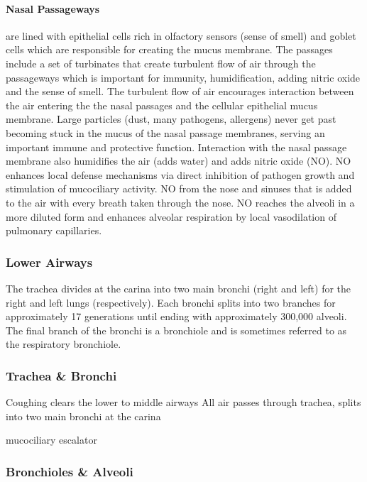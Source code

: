 \paragraph{Nasal Passageways} are lined with epithelial cells rich in olfactory sensors (sense of smell) and goblet cells which are responsible for creating the mucus membrane. The passages include a set of turbinates that create turbulent flow of air through the passageways which is important for immunity, humidification, adding nitric oxide and the sense of smell. The turbulent flow of air encourages interaction between the air entering the the nasal passages and the cellular epithelial mucus membrane. Large particles (dust, many pathogens, allergens) never get past becoming stuck in the mucus of the nasal passage membranes, serving an important immune and protective function. Interaction with the nasal passage membrane also humidifies the air (adds water) and adds nitric oxide (NO). NO enhances local defense mechanisms via direct inhibition of pathogen growth and stimulation of mucociliary activity. NO from the nose and sinuses that is added to the air with every breath taken through the nose. NO reaches the alveoli in a more diluted form and enhances alveolar respiration by local vasodilation of pulmonary capillaries.



\subsubsection{Lower Airways}
The trachea divides at the carina into two main bronchi (right and left) for the right and left lungs (respectively). Each bronchi splits into two branches for approximately 17 generations until ending with approximately 300,000 alveoli. The final branch of the bronchi is a bronchiole and is sometimes referred to as the respiratory bronchiole. 



\subsubsection{Trachea \& Bronchi}
Coughing clears the lower to middle airways
All air passes through trachea, splits into two main bronchi at the carina

mucociliary escalator


\subsubsection{Bronchioles \& Alveoli}

